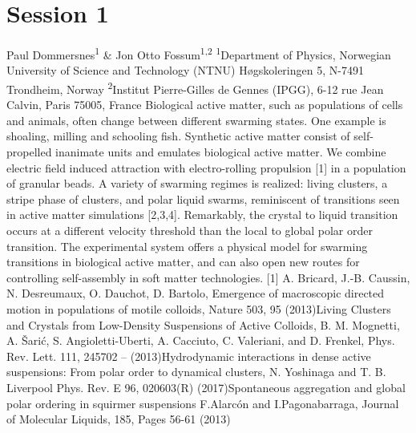 \documentclass{article}
\begin{document}
\section*{Session 1}
{Paul Dommersnes\textsuperscript{1} \& Jon Otto Fossum\textsuperscript{1,2}}
{\textsuperscript{1}Department of Physics, Norwegian University of Science and Technology (NTNU) Høgskoleringen 5, N-7491 Trondheim, Norway \newline
    \textsuperscript{2}Institut Pierre-Gilles de Gennes (IPGG), 6-12 rue Jean Calvin, Paris 75005, France}
{Biological active matter, such as populations of cells and animals, often change between
different swarming states. One example is shoaling, milling and schooling fish. Synthetic
active matter consist of self-propelled inanimate units and emulates biological active matter.
We combine electric field induced attraction with electro-rolling propulsion [1] in a
population of granular beads. A variety of swarming regimes is realized: living clusters, a stripe
phase of clusters, and polar liquid swarms, reminiscent of transitions seen in active matter
simulations [2,3,4]. Remarkably, the crystal to liquid transition occurs at a different velocity
threshold than the local to global polar order transition. The experimental system offers a
physical model for swarming transitions in biological active matter, and can also open new
routes for controlling self-assembly in soft matter technologies.\newline\newline
\small{
[1] A. Bricard, J.-B. Caussin, N. Desreumaux, O. Dauchot, D. Bartolo, Emergence of macroscopic
directed motion in populations of motile colloids, Nature 503, 95 (2013)\newline
[2] Living Clusters and Crystals from Low-Density Suspensions of Active Colloids, B. M. Mognetti, A.
Šarić, S. Angioletti-Uberti, A. Cacciuto, C. Valeriani, and D. Frenkel, Phys. Rev. Lett. 111, 245702 – (2013)\newline
[3] Hydrodynamic interactions in dense active suspensions: From polar order to dynamical clusters,
N. Yoshinaga and T. B. Liverpool Phys. Rev. E 96, 020603(R) (2017)\newline
[4] Spontaneous aggregation and global polar ordering in squirmer suspensions
F.Alarcón and I.Pagonabarraga, Journal of Molecular Liquids, 185, Pages 56-61 (2013)}}
\end{document}
